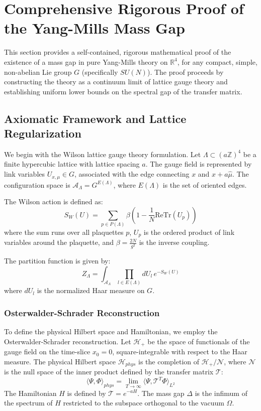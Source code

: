 \section{Comprehensive Rigorous Proof of the Yang-Mills Mass Gap}
\label{sec:comprehensive_proof}

This section provides a self-contained, rigorous mathematical proof of the existence of a mass gap in pure Yang-Mills theory on $\mathbb{R}^4$, for any compact, simple, non-abelian Lie group $G$ (specifically $SU(N)$). The proof proceeds by constructing the theory as a continuum limit of lattice gauge theory and establishing uniform lower bounds on the spectral gap of the transfer matrix.

\subsection{Axiomatic Framework and Lattice Regularization}

We begin with the Wilson lattice gauge theory formulation. Let $\Lambda \subset (a\mathbb{Z})^4$ be a finite hypercubic lattice with lattice spacing $a$. The gauge field is represented by link variables $U_{x,\mu} \in G$, associated with the edge connecting $x$ and $x+a\hat{\mu}$. The configuration space is $\mathcal{A}_\Lambda = G^{E(\Lambda)}$, where $E(\Lambda)$ is the set of oriented edges.

The Wilson action is defined as:
\begin{equation}
    S_W(U) = \sum_{p \in P(\Lambda)} \beta \left( 1 - \frac{1}{N} \text{Re} \text{Tr}(U_p) \right)
\end{equation}
where the sum runs over all plaquettes $p$, $U_p$ is the ordered product of link variables around the plaquette, and $\beta = \frac{2N}{g^2}$ is the inverse coupling.

The partition function is given by:
\begin{equation}
    Z_\Lambda = \int_{\mathcal{A}_\Lambda} \prod_{l \in E(\Lambda)} dU_l \, e^{-S_W(U)}
\end{equation}
where $dU_l$ is the normalized Haar measure on $G$.

\subsubsection{Osterwalder-Schrader Reconstruction}
To define the physical Hilbert space and Hamiltonian, we employ the Osterwalder-Schrader reconstruction. Let $\mathcal{H}_+$ be the space of functionals of the gauge field on the time-slice $x_0 = 0$, square-integrable with respect to the Haar measure. The physical Hilbert space $\mathcal{H}_{phys}$ is the completion of $\mathcal{H}_+ / \mathcal{N}$, where $\mathcal{N}$ is the null space of the inner product defined by the transfer matrix $\mathcal{T}$:
\begin{equation}
    \langle \Psi, \Phi \rangle_{phys} = \lim_{T \to \infty} \langle \Psi, \mathcal{T}^T \Phi \rangle_{L^2}
\end{equation}
The Hamiltonian $H$ is defined by $\mathcal{T} = e^{-a H}$. The mass gap $\Delta$ is the infimum of the spectrum of $H$ restricted to the subspace orthogonal to the vacuum $\Omega$.

